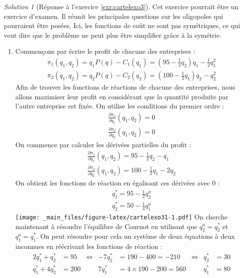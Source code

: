 \documentclass[
]{book}
\providecommand{\tightlist}{%
  \setlength{\itemsep}{0pt}\setlength{\parskip}{0pt}}
\theoremstyle{definition}
\theoremstyle{definition}
\theoremstyle{definition}
\theoremstyle{definition}
\theoremstyle{remark}
\newtheorem*{solution}{Solution}
\begin{document}
\begin{solution}[Réponse à l'exercice \ref{exr:cartelexo3}]
Cet exercice pourrait être un exercice d'examen.
Il réunit les principales questions sur les oligopoles qui pourraient être posées.
Ici, les fonctions de coût ne sont pas symétriques, ce qui veut dire que le problème ne peut plus être simplifier grâce à la symétrie.

\begin{enumerate}
\def\labelenumi{\arabic{enumi}.}
\tightlist
\item
  Commençons par écrire le profit de chacune des entreprises :
  \begin{gather*}
  \pi_1(q_1, q_2)=q_1P(q)-C_1(q_1)=\left(95-\frac{1}{2}q_2\right)q_1-\frac{1}{2}q_1^2\\
  \pi_2(q_1, q_2)=q_2P(q)-C_2(q_2)=\left(100-\frac{1}{2}q_1\right)q_2-q_2^2
  \end{gather*}
  Afin de trouver les fonctions de réactions de chacune des entreprises, nous allons maximiser leur profit en considérant que la quantité produite par l'autre entreprise est fixée.
  On utilise les conditions du premier ordre :
  \begin{gather*}
  \frac{\partial \pi_1}{\partial q_1}(q_1, q_2)=0\\
  \frac{\partial \pi_2}{\partial q_2}(q_1, q_2)=0
  \end{gather*}
  On commence par calculer les dérivées partielles du profit :
  \begin{gather*}
  \frac{\partial \pi_1}{\partial q_1}(q_1, q_2)=95-\frac{1}{2}q_2-q_1\\
  \frac{\partial \pi_2}{\partial q_2}(q_1, q_2)=100-\frac{1}{2}q_1-2q_2
  \end{gather*}
  On obtient les fonctions de réaction en égalisant ces dérivées avec 0 :
  \begin{gather*}
  q_1^*=95-\frac{1}{2}q_2^a\\
  q_2^*=50-\frac{1}{4}q_1^a
  \end{gather*}
  \texttt{[image: \_main\_files/figure-latex/cartelexo31-1.pdf]}
  On cherche maintenant à résoudre l'équilibre de Cournot en utilisant que \(q_2^a=q_2^*\) et \(q_1^a=q_1^*\).
  On peut résoudre pour cela un système de deux équations à deux inconnues en réécrivant les fonctions de réaction :
  \begin{align*}
  2q_1^*+q_2^*&=95 &\Leftrightarrow &-7q_2^*&=190-400=-210&\Leftrightarrow &q_2^*&=30\\
  q_1^*+4q_2^*&=200 & &7q_1^*&=4\times 190-200=560& &q_1^*&=80

\end{align*}
\end{enumerate}
\end{solution}
\end{document}
